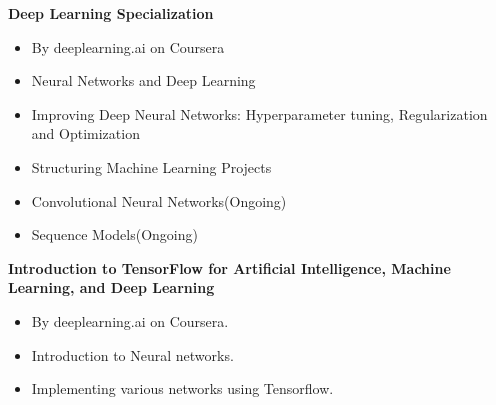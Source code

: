 \documentclass{my_cv}
\begin{document}
	\noindent
	\textbf{\aiCoursera\hspace{1mm} Deep Learning Specialization}
	\begin{itemize}
		\item By deeplearning.ai on Coursera
		\item Neural Networks and Deep Learning
		\item Improving Deep Neural Networks: Hyperparameter tuning, Regularization and Optimization
		\item Structuring Machine Learning Projects
		\item Convolutional Neural Networks(Ongoing)
		\item Sequence Models(Ongoing)
	\end{itemize}
	
	
	\noindent
	\textbf{\aiCoursera\hspace{1mm}Introduction to TensorFlow for Artificial Intelligence, Machine Learning, and Deep Learning}
	\begin{itemize}
		\item By deeplearning.ai on Coursera.
		\item Introduction to Neural networks.
		\item Implementing various networks using Tensorflow.
	\end{itemize}
\end{document}
